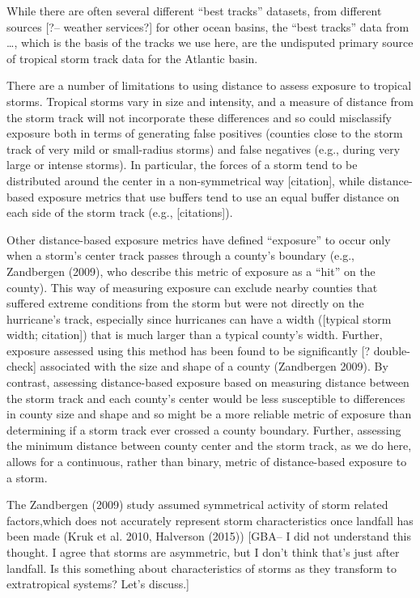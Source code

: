 \documentclass[]{elsarticle} %
\begin{document}
While there are often several different ``best tracks'' datasets, from
different sources {[}?-- weather services?{]} for other ocean basins,
the ``best tracks'' data from \ldots{}, which is the basis of the tracks
we use here, are the undisputed primary source of tropical storm track
data for the Atlantic basin.

There are a number of limitations to using distance to assess exposure
to tropical storms. Tropical storms vary in size and intensity, and a
measure of distance from the storm track will not incorporate these
differences and so could misclassify exposure both in terms of
generating false positives (counties close to the storm track of very
mild or small-radius storms) and false negatives (e.g., during very
large or intense storms). In particular, the forces of a storm tend to
be distributed around the center in a non-symmetrical way
{[}citation{]}, while distance-based exposure metrics that use buffers
tend to use an equal buffer distance on each side of the storm track
(e.g., {[}citations{]}).

Other distance-based exposure metrics have defined ``exposure'' to occur
only when a storm's center track passes through a county's boundary
(e.g., Zandbergen (2009), who describe this metric of exposure as a
``hit'' on the county). This way of measuring exposure can exclude
nearby counties that suffered extreme conditions from the storm but were
not directly on the hurricane's track, especially since hurricanes can
have a width ({[}typical storm width; citation{]}) that is much larger
than a typical county's width. Further, exposure assessed using this
method has been found to be significantly {[}? double-check{]}
associated with the size and shape of a county (Zandbergen 2009). By
contrast, assessing distance-based exposure based on measuring distance
between the storm track and each county's center would be less
susceptible to differences in county size and shape and so might be a
more reliable metric of exposure than determining if a storm track ever
crossed a county boundary. Further, assessing the minimum distance
between county center and the storm track, as we do here, allows for a
continuous, rather than binary, metric of distance-based exposure to a
storm.

The Zandbergen (2009) study assumed symmetrical activity of storm
related factors,which does not accurately represent storm
characteristics once landfall has been made (Kruk et al. 2010, Halverson
(2015)) {[}GBA-- I did not understand this thought. I agree that storms
are asymmetric, but I don't think that's just after landfall. Is this
something about characteristics of storms as they transform to
extratropical systems? Let's discuss.{]}
\end{document}
